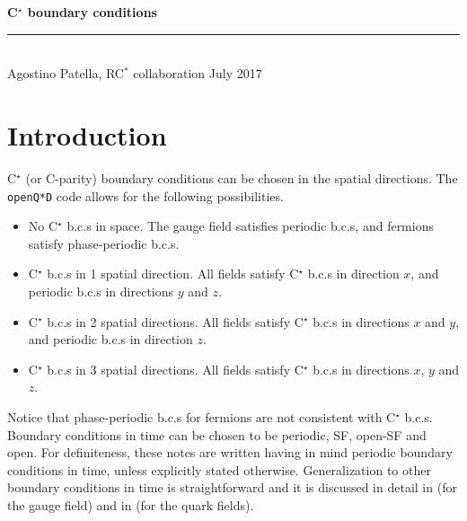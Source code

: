 \documentclass[11pt,fleqn]{article}
\begin{document}
\vspace*{20mm}

{
\sffamily
\huge
\textbf{C$^\star$ boundary conditions}
\\
\rule{\textwidth}{1pt}
\\[2mm]
\large
Agostino Patella, RC$^*$ collaboration
\hfill
July 2017
}


\vspace{30mm}


\tableofcontents

\pagebreak



\section{Introduction}

C$^\star$ (or C-parity) boundary conditions can be chosen in the spatial directions. The \texttt{openQ*D} code allows for the following possibilities.
\begin{itemize}
   \item No C$^\star$ b.c.s in space. The gauge field satisfies periodic b.c.s, and fermions satisfy phase-periodic b.c.s.
   \item C$^\star$ b.c.s in 1 spatial direction. All fields satisfy C$^\star$ b.c.s in direction $x$, and periodic b.c.s in directions $y$ and $z$.
   \item C$^\star$ b.c.s in 2 spatial directions. All fields satisfy C$^\star$ b.c.s in directions $x$ and $y$, and periodic b.c.s in direction $z$.
   \item C$^\star$ b.c.s in 3 spatial directions. All fields satisfy C$^\star$ b.c.s in directions $x$, $y$ and $z$.
\end{itemize}
Notice that phase-periodic b.c.s for fermions are not consistent with C$^\star$ b.c.s. Boundary conditions in time can be chosen to be periodic, SF, open-SF and open. For definiteness, these notes are written having in mind periodic boundary conditions in time, unless explicitly stated otherwise. Generalization to other boundary conditions in time is straightforward and it is discussed in detail in \cite{gauge_action} (for the gauge field) and in \cite{dirac} (for the quark fields).
\end{document}
